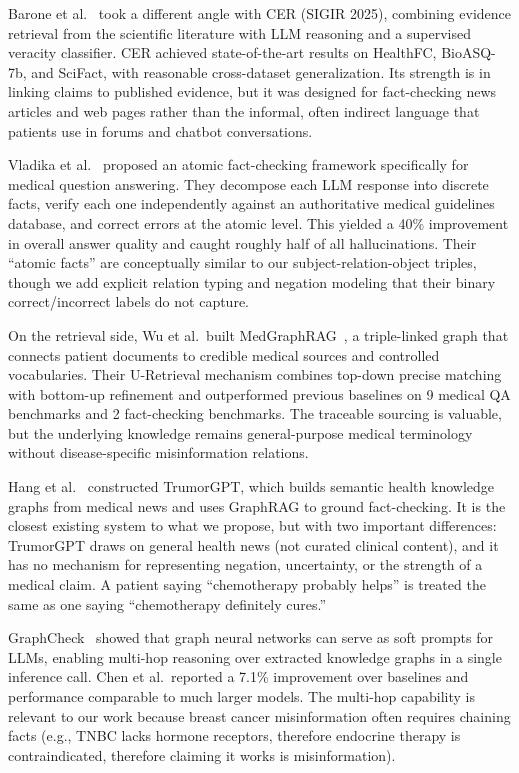 \documentclass[11pt,a4paper]{article}
\begin{document}
Barone et al.~\cite{barone2025cer} took a different angle with CER (SIGIR 2025), combining evidence retrieval from the scientific literature with LLM reasoning and a supervised veracity classifier. CER achieved state-of-the-art results on HealthFC, BioASQ-7b, and SciFact, with reasonable cross-dataset generalization. Its strength is in linking claims to published evidence, but it was designed for fact-checking news articles and web pages rather than the informal, often indirect language that patients use in forums and chatbot conversations.

Vladika et al.~\cite{vladika2025atomic} proposed an atomic fact-checking framework specifically for medical question answering. They decompose each LLM response into discrete facts, verify each one independently against an authoritative medical guidelines database, and correct errors at the atomic level. This yielded a 40\% improvement in overall answer quality and caught roughly half of all hallucinations. Their ``atomic facts'' are conceptually similar to our subject-relation-object triples, though we add explicit relation typing and negation modeling that their binary correct/incorrect labels do not capture.

On the retrieval side, Wu et al.\ built MedGraphRAG~\cite{wu2024medgraphrag}, a triple-linked graph that connects patient documents to credible medical sources and controlled vocabularies. Their U-Retrieval mechanism combines top-down precise matching with bottom-up refinement and outperformed previous baselines on 9 medical QA benchmarks and 2 fact-checking benchmarks. The traceable sourcing is valuable, but the underlying knowledge remains general-purpose medical terminology without disease-specific misinformation relations.

Hang et al.~\cite{hang2025trumor} constructed TrumorGPT, which builds semantic health knowledge graphs from medical news and uses GraphRAG to ground fact-checking. It is the closest existing system to what we propose, but with two important differences: TrumorGPT draws on general health news (not curated clinical content), and it has no mechanism for representing negation, uncertainty, or the strength of a medical claim. A patient saying ``chemotherapy probably helps'' is treated the same as one saying ``chemotherapy definitely cures.''

GraphCheck~\cite{chen2025graphcheck} showed that graph neural networks can serve as soft prompts for LLMs, enabling multi-hop reasoning over extracted knowledge graphs in a single inference call. Chen et al.\ reported a 7.1\% improvement over baselines and performance comparable to much larger models. The multi-hop capability is relevant to our work because breast cancer misinformation often requires chaining facts (e.g., TNBC lacks hormone receptors, therefore endocrine therapy is contraindicated, therefore claiming it works is misinformation).
\end{document}
